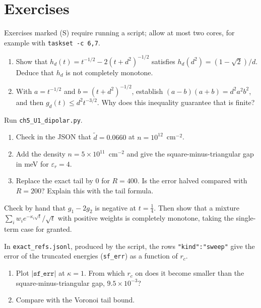 
\section{Exercises}\label{ch5:exercices}
Exercises marked (S) require running a script; allow at most two cores, for example with
\texttt{taskset -c 6,7}.

\begin{exercise}[U1, computation]\label{ch5:ex:hd}
\begin{enumerate}
\item Show that $h_d(t)=t^{-1/2}-2(t+d^2)^{-1/2}$ satisfies $h_d(d^2)=(1-\sqrt2)/d$. Deduce that $h_d$ is
not completely monotone.
\item With $a=t^{-1/2}$ and $b=(t+d^2)^{-1/2}$, establish $(a-b)(a+b)=d^2a^2b^2$, and then $g_d(t)\le d^2t^{-3/2}$.
Why does this inequality guarantee that  is finite?
\end{enumerate}
\end{exercise}

\begin{exercise}[U1, (S)]\label{ch5:ex:U1}
Run \texttt{ch5\_U1\_dipolar.py}.
\begin{enumerate}
\item Check in the JSON that $\tilde d=0.0660$ at $n=10^{12}$~cm$^{-2}$.
\item Add the density $n=5\times10^{11}$~cm$^{-2}$ and give the square-minus-triangular gap in meV for
$\varepsilon_r=4$.
\item Replace the exact tail by $0$ for $R=400$. Is the error halved compared with $R=200$?
Explain this with the tail formula.
\end{enumerate}
\end{exercise}

\begin{exercise}[U2, computation]\label{ch5:ex:U2a}
Check by hand that $g_1-2g_2$ is negative at $t=\tfrac14$. Then show that a mixture
$\sum_iw_ie^{-\kappa_i\sqrt t}/\sqrt t$ with positive weights is completely monotone, taking the single-term case
for granted.
\end{exercise}

\begin{exercise}[U2, (S)]\label{ch5:ex:U2b}
In \texttt{exact\_refs.jsonl}, produced by the script, the rows \texttt{"kind":"sweep"} give the error of the
truncated energies (\texttt{sf\_err}) as a function of $r_c$.
\begin{enumerate}
\item Plot $|\texttt{sf\_err}|$ at $\kappa=1$. From which $r_c$ on does it become smaller than the square-minus-triangular
gap, $9.5\times10^{-3}$?
\item Compare with the Voronoi tail bound.
\end{enumerate}
\end{exercise}

